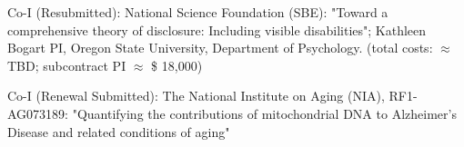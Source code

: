 \item Co-I (Resubmitted): National Science Foundation (SBE): "Toward a comprehensive theory of disclosure: Including visible disabilities"; Kathleen Bogart PI, Oregon State University, Department of Psychology.  (total costs: $\approx$ TBD; subcontract PI $\approx$ \$ 18,000)

\item Co-I (Renewal Submitted): The National Institute on Aging (NIA), RF1-AG073189: "Quantifying the contributions of mitochondrial DNA to Alzheimer's Disease and related conditions of aging"



%
%

